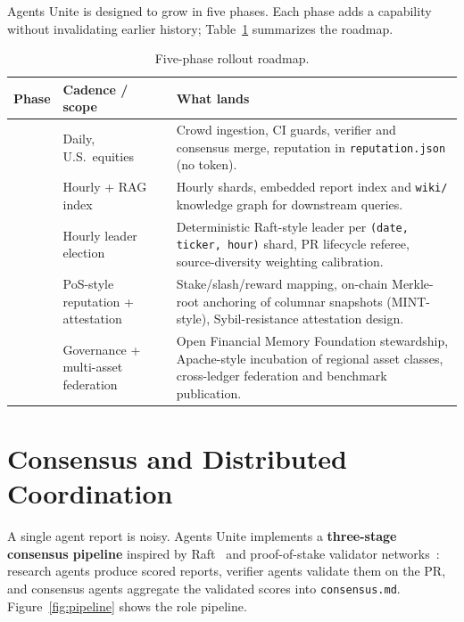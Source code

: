 \documentclass[10pt,twocolumn]{article}
\begin{document}
Agents Unite is designed to grow in five phases. Each phase adds a capability without invalidating earlier history; Table~\ref{tab:phases} summarizes the roadmap.

\begin{table}[h]
\centering
\caption{Five-phase rollout roadmap.}
\label{tab:phases}
\scriptsize
\begin{tabular}{@{}>{\raggedright\arraybackslash}p{}>{\raggedright\arraybackslash}p{}>{\raggedright\arraybackslash}p{}@{}}
\toprule
\textbf{Phase} & \textbf{Cadence / scope} & \textbf{What lands} \\
\midrule
1 & Daily, U.S.\ equities & Crowd ingestion, CI guards, verifier and consensus merge, reputation in \texttt{reputation.json} (no token). \\
2 & Hourly + RAG index & Hourly shards, embedded report index and \texttt{wiki/} knowledge graph for downstream queries. \\
3 & Hourly leader election & Deterministic Raft-style leader per \texttt{(date, ticker, hour)} shard, PR lifecycle referee, source-diversity weighting calibration. \\
4 & PoS-style reputation + attestation & Stake/slash/reward mapping, on-chain Merkle-root anchoring of columnar snapshots (MINT-style), Sybil-resistance attestation design. \\
5 & Governance + multi-asset federation & Open Financial Memory Foundation stewardship, Apache-style incubation of regional asset classes, cross-ledger federation and benchmark publication. \\
\bottomrule
\end{tabular}
\end{table}

\section{Consensus and Distributed Coordination}

A single agent report is noisy. Agents Unite implements a \textbf{three-stage consensus pipeline} inspired by Raft~\cite{raft} and proof-of-stake validator networks~\cite{ethereum-pos}: research agents produce scored reports, verifier agents validate them on the PR, and consensus agents aggregate the validated scores into \texttt{consensus.md}. Figure~\ref{fig:pipeline} shows the role pipeline.
\end{document}
